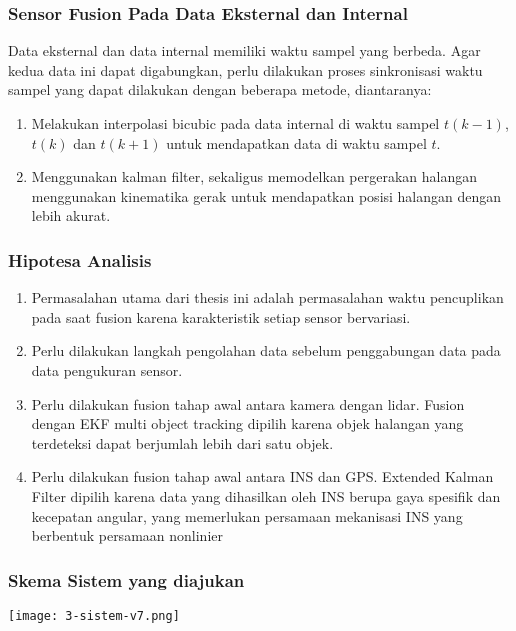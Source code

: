 \begin{frame}
    \frametitle{Sensor Fusion Pada Data Eksternal dan Internal}

    Data eksternal dan data internal memiliki waktu sampel yang berbeda. Agar kedua data ini dapat digabungkan, perlu dilakukan proses sinkronisasi waktu sampel yang dapat dilakukan dengan beberapa metode, diantaranya:
    \begin{enumerate}
        \item Melakukan interpolasi bicubic pada data internal di waktu sampel $t(k-1)$, $t(k)$ dan $t(k+1)$ untuk mendapatkan data di waktu sampel $t$.
        \item Menggunakan kalman filter, sekaligus memodelkan pergerakan halangan menggunakan kinematika gerak untuk mendapatkan posisi halangan dengan lebih akurat.
    \end{enumerate}

\end{frame}


\begin{frame}
    \frametitle{Hipotesa Analisis}

    \begin{enumerate}
        \item Permasalahan utama dari thesis ini adalah permasalahan waktu pencuplikan pada saat fusion karena karakteristik setiap sensor bervariasi.
        \item Perlu dilakukan langkah pengolahan data sebelum penggabungan data pada data pengukuran sensor.
        \item Perlu dilakukan fusion tahap awal antara kamera dengan lidar. Fusion dengan EKF multi object tracking dipilih karena objek halangan yang terdeteksi dapat berjumlah lebih dari satu objek.
        \item Perlu dilakukan fusion tahap awal antara INS dan GPS. Extended Kalman Filter dipilih karena data yang dihasilkan oleh INS berupa gaya spesifik dan kecepatan angular, yang memerlukan persamaan mekanisasi INS yang berbentuk persamaan nonlinier
    \end{enumerate}
\end{frame}


\begin{frame}
    \frametitle{Skema Sistem yang diajukan}
    \begin{center}
        \texttt{[image: 3-sistem-v7.png]}
    \end{center}
\end{frame}


